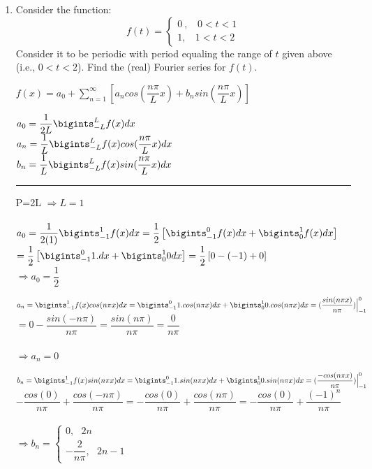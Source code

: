 \documentclass[fleqn]{article}
\begin{document}
  \begin{enumerate}
    \item Consider the function:
    \begin{equation}
      f(t)=\begin{cases}
      0~, ~~~~0< t < 1 \\
      1, ~~~~1< t< 2 
      \end{cases}
    \end{equation}
    Consider it to be periodic with period equaling the range of $t$ given above (i.e., $0<t<2$). Find the (real) Fourier series for $f(t)$.

      \textcolor{hwColor}{
        $f(x)=a_0+\sum\limits_{n=1}^{\infty}\left[a_n cos(\dfrac{n\pi}{L}x)+b_n sin(\dfrac{n\pi}{L}x)\right]$
      }

      \textcolor{hwColor}{
        $a_0=\dfrac{1}{2L}\bigints_{-L}^{L}f(x)dx$ \\
        $a_n=\dfrac{1}{L}\bigints_{-L}^{L}f(x) cos(\dfrac{n\pi}{L}x)dx$ \\
        $b_n=\dfrac{1}{L}\bigints_{-L}^{L}f(x) sin(\dfrac{n\pi}{L}x)dx$ \\
      }

      \textcolor{hwColor}{ 
        \rule{15cm}{0.4pt} 
      }

      \textcolor{hwColor}{ 
        P=2L $\Longrightarrow L=1$ \\
        \\
        $a_0=\dfrac{1}{2(1)}\bigints_{-1}^{1}f(x)dx=\dfrac{1}{2}\left[\bigints_{-1}^{0}f(x)dx+\bigints_{0}^{1}f(x)dx\right]$ \\
        $=\dfrac{1}{2}\left[\bigints_{-1}^{0}1.dx+\bigints_{0}^{1}0dx\right]=\dfrac{1}{2}\left[0-(-1)+0\right]$ \\
        $\Longrightarrow a_0=\dfrac{1}{2}$
      }

      \bigbreak

      \textcolor{hwColor}{ 
        $a_n=\bigints_{-1}^{1}f(x) cos(n\pi x)dx=\bigints_{-1}^{0}1.cos(n\pi x)dx+\bigints_{0}^{1}0.cos(n\pi x)dx=(\dfrac{sin(n\pi x)}{n\pi})\Big|_{-1}^{0}$ \\
        $=0-\dfrac{sin(-n\pi)}{n\pi}=\dfrac{sin(n\pi)}{n\pi}=\dfrac{0}{n\pi}$ \\
        \\
        $\Longrightarrow a_n=0$
      }

      \bigbreak

      \textcolor{hwColor}{ 
        $b_n=\bigints_{-1}^{1}f(x) sin(n\pi x)dx=\bigints_{-1}^{0}1.sin(n\pi x)dx+\bigints_{0}^{1}0.sin(n\pi x)dx=(\dfrac{-cos(n\pi x)}{n\pi})\Big|_{-1}^{0}$ \\
        $-\dfrac{cos(0)}{n\pi}+\dfrac{cos(-n\pi)}{n\pi}=-\dfrac{cos(0)}{n\pi}+\dfrac{cos(n\pi)}{n\pi}=-\dfrac{cos(0)}{n\pi}+\dfrac{(-1)^n}{n\pi}$\\
        \\
        $\Longrightarrow b_n=\begin{cases}
          0,~~~ 2n \\
          -\dfrac{2}{n\pi}, ~~~ 2n-1 
        \end{cases}$
      }


\end{enumerate}
\end{document}
